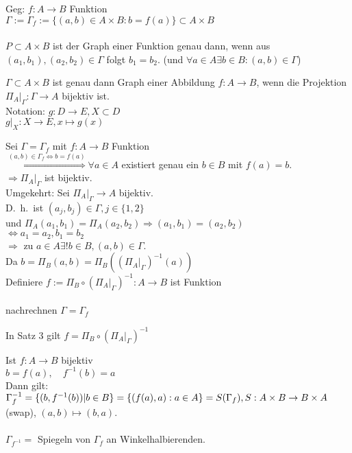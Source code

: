 \documentclass[../ana1.tex]{subfiles}
\begin{document}
\begin{defi}
	Geg: \(f: A \rightarrow B\) Funktion\\
	\(\Gamma := \Gamma_f := \{(a,b) \in A\times B : b = f(a)\} \subset A\times B\) \\
	\quad
	\\
	\(P\subset A\times B\) ist der Graph einer Funktion genau dann, wenn aus \((a_1,b_1), (a_2,b_2) \in \Gamma \) folgt \(b_1 = b_2\). (und \(\forall a\in A \exists b\in B:(a,b)\in\Gamma \))
\end{defi}
\begin{satz}
	\(\Gamma \subset A\times B\) ist genau dann Graph einer Abbildung \(f: A\rightarrow B\), wenn die Projektion \(\Pi_A \vert_\Gamma : \Gamma \rightarrow A\) bijektiv ist.\\
	Notation: \(g: D \rightarrow E, X\subset D\) \\
	\(g\vert_X: X\rightarrow E, x\mapsto g(x)\) \\
\end{satz}
\begin{bew}
	Sei \(\Gamma = \Gamma_f \) mit \(f: A\rightarrow B\) Funktion\\
	\(\overset{(a,b)\in \Gamma_f \Leftrightarrow b = f(a)}{\Rightarrow} \forall a\in A\) existiert genau ein \(b\in B\) mit \(f(a) = b\).\\
	\(\Rightarrow \Pi_A \vert_\Gamma \) ist bijektiv.\\
	Umgekehrt: Sei \(\Pi_A \vert_\Gamma \rightarrow A\) bijektiv.\\
	D.\ h.\ ist \( (a_j, b_j) \in \Gamma, j \in \{1,2\} \) \\
	und \( \Pi_A(a_1, b_1) = \Pi_A(a_2, b_2) \Rightarrow (a_1, b_1) = (a_2, b_2)\) \\
	\(\Leftrightarrow a_1 = a_2, b_1 = b_2\) \\
	\(\Rightarrow \) zu \(a\in A \exists ! b\in B, (a,b) \in \Gamma \).\\
	Da \( b=\Pi_B(a,b) = \Pi_B({(\Pi_A\vert_\Gamma)}^{-1}(a)) \) \\
	Definiere \(f:= \Pi_B \circ {(\Pi_A\vert_\Gamma)}^{-1}:A\rightarrow B\) ist Funktion\\
	\\
	nachrechnen \( \Gamma = \Gamma_f \)
\end{bew}
\begin{bem}
	In Satz 3 gilt \(f = \Pi_B \circ {(\Pi_A\vert_\Gamma)}^{-1} \) %
\end{bem}
\begin{bsp}
	Ist \(f: A\rightarrow B\) bijektiv\\
	\(b=f(a),\quad f^{-1}(b)=a\) \\
	Dann gilt: \(\Gamma_f^{-1} = \{(b, f^{-1}(b)) | b\in B\} \\
	= \{(f(a),a):a\in A\} = S(\Gamma_f), S: A\times B \rightarrow B\times A\) (swap), \( (a,b)\mapsto(b,a) \).\\
	 \quad
	\\
	\(\Gamma_{f^{-1}} = \) Spiegeln von \( \Gamma_f \) an Winkelhalbierenden.
\end{bsp}
\end{document}
